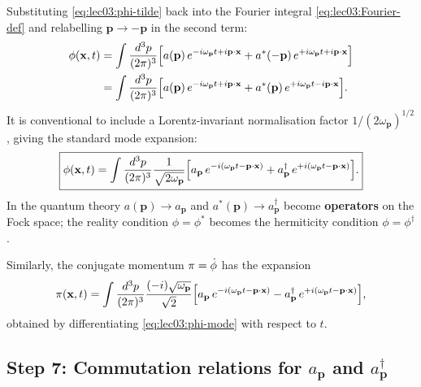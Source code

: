 Substituting \eqref{eq:lec03:phi-tilde} back into the Fourier integral
\eqref{eq:lec03:Fourier-def} and relabelling $\mathbf{p}\to -\mathbf{p}$
in the second term:
\begin{align}
  \phi(\mathbf{x},t)
  &= \int \frac{d^3p}{(2\pi)^3}
     \Bigl[
       a(\mathbf{p})\,e^{-i\omega_{\mathbf{p}} t + i\mathbf{p}\cdot\mathbf{x}}
       + a^*(-\mathbf{p})\,e^{+i\omega_{\mathbf{p}} t + i\mathbf{p}\cdot\mathbf{x}}
     \Bigr]
  \notag \\
  &= \int \frac{d^3p}{(2\pi)^3}
     \Bigl[
       a(\mathbf{p})\,e^{-i\omega_{\mathbf{p}} t + i\mathbf{p}\cdot\mathbf{x}}
       + a^*(\mathbf{p})\,e^{+i\omega_{\mathbf{p}} t - i\mathbf{p}\cdot\mathbf{x}}
     \Bigr].
  \label{eq:lec03:phi-expand-pre}
\end{align}
It is conventional to include a Lorentz-invariant normalisation factor
$1/(2\omega_{\mathbf{p}})^{1/2}$, giving the standard mode expansion:
\begin{equation}
  \boxed{
  \phi(\mathbf{x},t)
  = \int \frac{d^3p}{(2\pi)^3}
    \frac{1}{\sqrt{2\omega_{\mathbf{p}}}}
    \Bigl[
      a_{\mathbf{p}}\,e^{-i(\omega_{\mathbf{p}} t - \mathbf{p}\cdot\mathbf{x})}
      + a_{\mathbf{p}}^\dagger\,
        e^{+i(\omega_{\mathbf{p}} t - \mathbf{p}\cdot\mathbf{x})}
    \Bigr].
  }
  \label{eq:lec03:phi-mode}
\end{equation}
In the quantum theory $a(\mathbf{p})\to a_{\mathbf{p}}$ and
$a^*(\mathbf{p})\to a_{\mathbf{p}}^\dagger$ become
\textbf{operators} on the Fock space;
the reality condition $\phi=\phi^*$ becomes the hermiticity condition
$\phi=\phi^\dagger$.

Similarly, the conjugate momentum $\pi=\dot{\phi}$ has the expansion
\begin{equation}
  \pi(\mathbf{x},t)
  = \int \frac{d^3p}{(2\pi)^3}
    \frac{(-i)\sqrt{\omega_{\mathbf{p}}}}{\sqrt{2}}
    \Bigl[
      a_{\mathbf{p}}\,e^{-i(\omega_{\mathbf{p}} t - \mathbf{p}\cdot\mathbf{x})}
      - a_{\mathbf{p}}^\dagger\,
        e^{+i(\omega_{\mathbf{p}} t - \mathbf{p}\cdot\mathbf{x})}
    \Bigr],
  \label{eq:lec03:pi-mode}
\end{equation}
obtained by differentiating \eqref{eq:lec03:phi-mode} with respect to $t$.

\subsection*{Step 7: Commutation relations for $a_{\mathbf{p}}$ and $a_{\mathbf{p}}^\dagger$}

